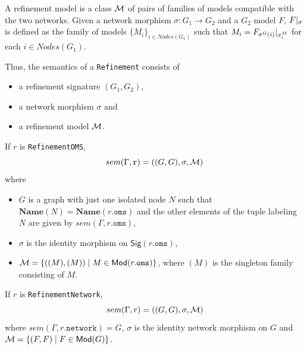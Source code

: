 \documentclass[10pt, a4paper]{isov2}
\newcommand*{\syntax}[1]{\texttt{#1}}
\newcommand{\Sig}{\mathsf{Sig}}
\newcommand{\Name}{\ensuremath{\mathbf{Name}}}
\begin{document}
A refinement model is a class ${\cal M}$ 
of pairs of families of models compatible with the two networks. 
Given a network morphism $\sigma:G_1\to G_2$ and a $G_2$ model $F$, 
 $F|_{\sigma}$ is defined as the family of models 
$\{M_i\}_{i\in Nodes(G_1)}$ such that
$M_i = F_{\sigma^G(i)}|_{\sigma^M_{i}}$ for each $i\in Nodes(G_1)$.

Thus, the semantics of a \syntax{Refinement} consists of
\begin{itemize}
 \item a refinement signature $(G_1,G_2)$,
 \item a network morphism $\sigma$ and
 \item a refinement model ${\cal M}$.
\end{itemize}
\medskip

If $r$ is \syntax{RefinementOMS},
$$sem(\Gamma, \syntax{r}) = 
   ((G, G), \sigma, \cM) $$
  \noindent where 
  \begin{itemize}
  \item $G$ is a graph with just one isolated node $N$
  such that $\Name(N) = \Name(r.\syntax{oms})$
  and the other elements of the tuple labeling
  $N$ are given by $sem(\Gamma,r.\syntax{oms})$,
  \item $\sigma$ is the identity morphism on 
  $\Sig(r.\syntax{oms})$,  
  \item $\cM = \{((M), (M)) \mid M \in \Mod(r.\syntax{oms})\}$,
   where $(M)$ is the singleton family consisting of $M$.
  \end{itemize}

If $r$ is \syntax{RefinementNetwork},
$$sem(\Gamma, r) = ((G, G), \sigma, {\cal M})$$
\noindent 
where $sem(\Gamma, r.\syntax{network}) = G$,
$\sigma$ is the identity network morphism on $G$
and 
${\cal M} = \{ (F, F) \mid F \in \mathsf{Mod}(G)\}$.
\end{document}
